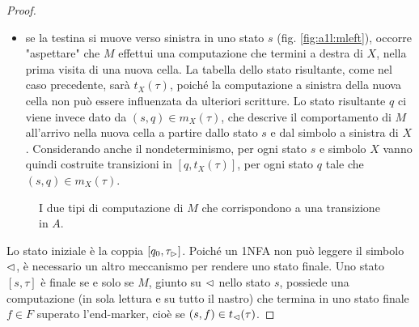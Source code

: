 \begin{proof}
\begin{itemize}
		\item se la testina si muove verso sinistra in uno stato $s$ (fig. \ref{fig:a1l:mleft}), occorre "aspettare" che $M$ effettui una computazione che termini a destra di $X$, nella prima visita di una nuova cella. La tabella dello stato risultante, come nel caso precedente, sarà $t_X(\tau)$, poiché la computazione a sinistra della nuova cella non può essere influenzata da ulteriori scritture. Lo stato risultante $q$ ci viene invece dato da $(s,q)\in m_X(\tau)$, che descrive il comportamento di $M$ all'arrivo nella nuova cella a partire dallo stato $s$ e dal simbolo a sinistra di $X$. Considerando anche il nondeterminismo, per ogni stato $s$ e simbolo $X$ vanno quindi costruite transizioni in $[q,t_X(\tau)]$, per ogni stato $q$ tale che $(s,q)\in m_X(\tau)$.
	\end{itemize}

	\begin{figure}
		\centering
		\qquad
		\caption{I due tipi di computazione di $M$ che corrispondono a una transizione in $A$.}
	\end{figure}

	Lo stato iniziale è la coppia $[q_0,\tau_\rhd]$. Poiché un 1NFA non può leggere il simbolo $\lhd$, è necessario un altro meccanismo per rendere uno stato finale. Uno stato $[s,\tau]$ è finale se e solo se $M$, giunto su $\lhd$ nello stato $s$, possiede una computazione (in sola lettura e su tutto il nastro) che termina in uno stato finale $f\in F$ superato l'end-marker, cioè se $(s,f)\in t_\lhd(\tau)$.


\end{proof}
